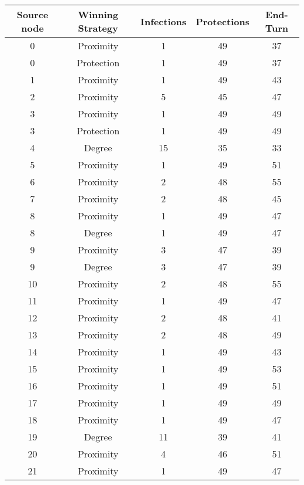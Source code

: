 \documentclass[results.tex]{subfiles}
\begin{document}
\begin{center}
  \begin{tabular}{| c || c | c | c | c |}
    \hline
    {\bfseries Source node} & {\bfseries Winning Strategy} & {\bfseries Infections} & {\bfseries Protections} & {\bfseries End-Turn} \\  %
    \hline\hline
    0 & Proximity & 1 & 49 & 37 \\ 
    \hline
    0 & Protection & 1 & 49 & 37 \\ 
    \hline
    1 & Proximity & 1 & 49 & 43 \\ 
    \hline
    2 & Proximity & 5 & 45 & 47 \\ 
    \hline
    3 & Proximity & 1 & 49 & 49 \\ 
    \hline
    3 & Protection & 1 & 49 & 49 \\ 
    \hline
    4 & Degree & 15 & 35 & 33 \\ 
    \hline
    5 & Proximity & 1 & 49 & 51 \\ 
    \hline
    6 & Proximity & 2 & 48 & 55 \\ 
    \hline
    7 & Proximity & 2 & 48 & 45 \\ 
    \hline
    8 & Proximity & 1 & 49 & 47 \\ 
    \hline
    8 & Degree & 1 & 49 & 47 \\ 
    \hline
    9 & Proximity & 3 & 47 & 39 \\ 
    \hline
    9 & Degree & 3 & 47 & 39 \\ 
    \hline
    10 & Proximity & 2 & 48 & 55 \\ 
    \hline
    11 & Proximity & 1 & 49 & 47 \\ 
    \hline
    12 & Proximity & 2 & 48 & 41 \\ 
    \hline
    13 & Proximity & 2 & 48 & 49 \\ 
    \hline
    14 & Proximity & 1 & 49 & 43 \\ 
    \hline
    15 & Proximity & 1 & 49 & 53 \\ 
    \hline
    16 & Proximity & 1 & 49 & 51 \\ 
    \hline
    17 & Proximity & 1 & 49 & 49 \\ 
    \hline
    18 & Proximity & 1 & 49 & 47 \\ 
    \hline
    19 & Degree & 11 & 39 & 41 \\ 
    \hline
    20 & Proximity & 4 & 46 & 51 \\ 
    \hline
    21 & Proximity & 1 & 49 & 47 \\ 

\end{tabular}
\end{center}
\end{document}
